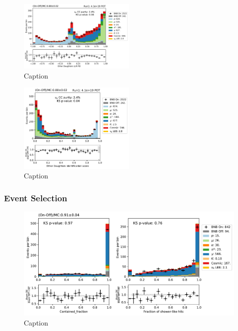 \begin{figure}
    \centering
    \includegraphics[width=0.5\textwidth]{NueCCsel/Images/run1/pre_daughter_pid.pdf}
    \caption{Caption}
    \label{fig:pre_daughter_pid}
\end{figure}

\begin{figure}
    \centering
    \includegraphics[width=0.5\textwidth]{NueCCsel/Images/run1/pre_daughter_score.pdf}
    \caption{Caption}
    \label{fig:pre_daughter_score}
\end{figure}

\subsubsection{Event Selection}

\begin{figure}
    \centering
    \includegraphics[width=\textwidth]{NueCCsel/Images/run1/bdt_1.pdf}
    \caption{Caption}
    \label{fig:bdt_1}
\end{figure}

